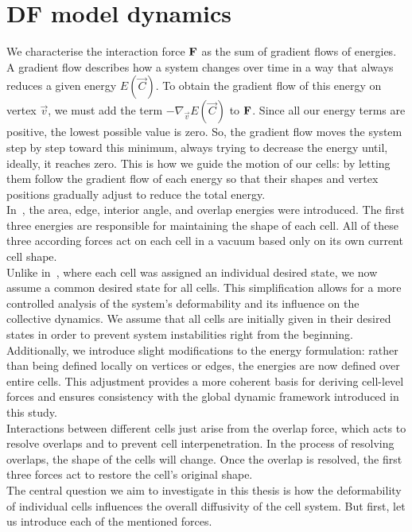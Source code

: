 \section{DF model dynamics} 
We characterise the interaction force $\mathbf{F}$ as the sum of gradient flows of energies. \\
A gradient flow describes how a system changes over time in a way that always reduces a given energy $E(\vec{C})$.
To obtain the gradient flow of this energy on vertex $\vec{v}$, we must add the term $-\nabla_{\vec{v}} E(\vec{C})$ to $\mathbf{F}$.
Since all our energy terms are positive, the lowest possible value is zero.  
So, the gradient flow moves the system step by step toward this minimum, always trying to decrease the energy until, ideally, it reaches zero. 
This is how we guide the motion of our cells: by letting them follow the gradient flow of each energy so that their shapes and vertex positions gradually adjust to reduce the total energy. \\
In~\cite{Vogel2023}, the area, edge, interior angle, and overlap energies were introduced.
The first three energies are responsible for maintaining the shape of each cell. 
All of these three according forces act on each cell in a vacuum based only on its own current cell shape. \\
Unlike in~\cite{Vogel2023}, where each cell was assigned an individual desired state, we now assume a common desired state for all cells. This simplification allows for a more controlled analysis of the system's deformability and its influence on the collective dynamics.
We assume that all cells are initially given in their desired states in order to prevent system instabilities right from the beginning. \\
Additionally, we introduce slight modifications to the energy formulation: rather than being defined locally on vertices or edges, the energies are now defined over entire cells. 
This adjustment provides a more coherent basis for deriving cell-level forces and ensures consistency with the global dynamic framework introduced in this study. \\
Interactions between different cells just arise from the overlap force, which acts to resolve overlaps and to prevent cell interpenetration. 
In the process of resolving overlaps, the shape of the cells will change.  
Once the overlap is resolved, the first three forces act to restore the cell's original shape. \\
The central question we aim to investigate in this thesis is how the deformability of individual cells influences the overall diffusivity of the cell system.
But first, let us introduce each of the mentioned forces. 

